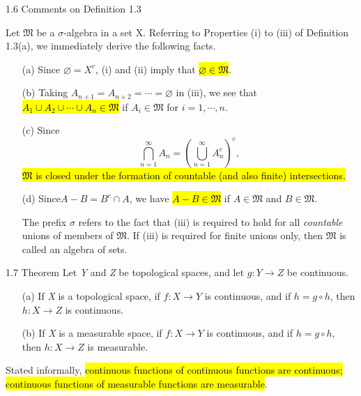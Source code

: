 \documentclass{article}
\begin{document}
\begin{com}{1.6 Comments on Definition 1.3}

Let $\mathfrak{M}$ be a $\sigma$-algebra in a set X. Referring to Properties (i) to (iii) of Definition 1.3(a), we immediately derive the following facts.

\begin{enumerate}
  \item [(a)] Since $\varnothing= X^c$, (i) and (ii) imply that \hl{$\varnothing\in\mathfrak{M}$}.
  \item [(b)] Taking $A_{n+1}=A_{n+2}=\cdots=\varnothing$ in (iii), we see that \hl{$A_1\cup A_2\cup\cdots\cup A_n\in\mathfrak{M}$} if $A_i\in\mathfrak{M}$ for $i=1,\cdots,n$.
  \item [(c)] Since
  \begin{displaymath}
  \bigcap_{n=1}^\infty A_n=(\bigcup_{n=1}^\infty A_n^c)^c,
\end{displaymath}
\hl{$\mathfrak{M}$ is closed under the formation of countable (and also finite) intersections.}
  \item [(d)] Since$A-B=B^c\cap A$, we have \hl{$A-B\in\mathfrak{M}$} if $A\in\mathfrak{M}$ and $B\in\mathfrak{M}$.

The prefix $\sigma$ refers to the fact that (iii) is required to hold for all \textit{countable} unions of members of $\mathfrak{M}$. If (iii) is required for finite unions only, then $\mathfrak{M}$ is called an algebra of sets.

\end{enumerate}


\end{com}

\begin{theo}{1.7 Theorem}
	Let \textit{Y} and \textit{Z} be topological spaces, and let $g: Y\rightarrow Z$ be continuous.
	\begin{enumerate}
  \item [(a)] If \textit{X} is a topological space, if $f: X\rightarrow Y$ is continuous, and if $h=g\circ h$, then $h: X\rightarrow Z$ is continuous.
  \item [(b)] If \textit{X} is a measurable space, if $f: X\rightarrow Y$ is continuous, and if $h=g\circ h$, then $h: X\rightarrow Z$ is measurable.
\end{enumerate}
 
 Stated informally, \hl{continuous functions of continuous functions are continuous; continuous functions of measurable functions are measurable}.
 
\end{theo}
\end{document}
